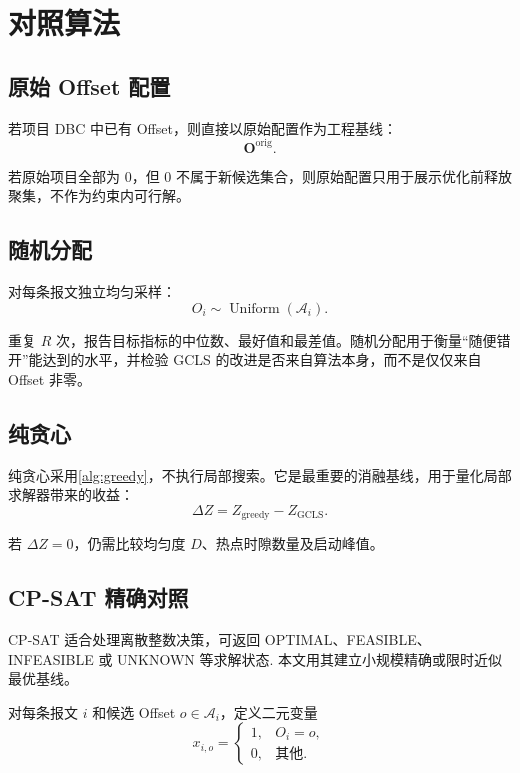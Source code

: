 \documentclass[UTF8,12pt,a4paper]{ctexart}
\newcommand{\Oset}{\mathcal{A}}
\begin{document}
\section{对照算法}

\subsection{原始 Offset 配置}

若项目 DBC 中已有 Offset，则直接以原始配置作为工程基线：
\begin{equation}
 \symbf{O}^{\mathrm{orig}}.
\end{equation}

若原始项目全部为 0，但 0 不属于新候选集合，则原始配置只用于展示优化前释放聚集，不作为约束内可行解。

\subsection{随机分配}

对每条报文独立均匀采样：
\begin{equation}
 O_i\sim \operatorname{Uniform}(\Oset_i).
\end{equation}

重复 $R$ 次，报告目标指标的中位数、最好值和最差值。随机分配用于衡量“随便错开”能达到的水平，并检验 GCLS 的改进是否来自算法本身，而不是仅仅来自 Offset 非零。

\subsection{纯贪心}

纯贪心采用\cref{alg:greedy}，不执行局部搜索。它是最重要的消融基线，用于量化局部求解器带来的收益：
\begin{equation}
 \Delta Z=Z_{\mathrm{greedy}}-Z_{\mathrm{GCLS}}.
\end{equation}

若 $\Delta Z=0$，仍需比较均匀度 $D$、热点时隙数量及启动峰值。

\subsection{CP-SAT 精确对照}

CP-SAT 适合处理离散整数决策，可返回 OPTIMAL、FEASIBLE、INFEASIBLE 或 UNKNOWN 等求解状态\cite{ortools}. 本文用其建立小规模精确或限时近似最优基线。

对每条报文 $i$ 和候选 Offset $o\in\Oset_i$，定义二元变量
\begin{equation}
 x_{i,o}=\begin{cases}
 1,& O_i=o,\\
 0,& \text{其他}.
 \end{cases}
\end{equation}
\end{document}
